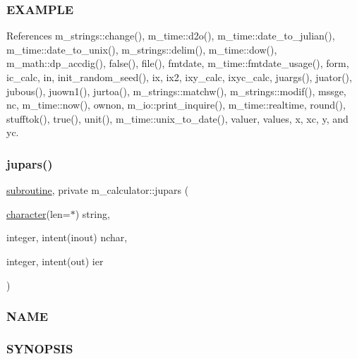 \subsubsection*{E\+X\+A\+M\+P\+LE}

References m\+\_\+strings\+::change(), m\+\_\+time\+::d2o(), m\+\_\+time\+::date\+\_\+to\+\_\+julian(), m\+\_\+time\+::date\+\_\+to\+\_\+unix(), m\+\_\+strings\+::delim(), m\+\_\+time\+::dow(), m\+\_\+math\+::dp\+\_\+accdig(), false(), file(), fmtdate, m\+\_\+time\+::fmtdate\+\_\+usage(), form, ic\+\_\+calc, in, init\+\_\+random\+\_\+seed(), ix, ix2, ixy\+\_\+calc, ixyc\+\_\+calc, juargs(), juator(), jubous(), juown1(), jurtoa(), m\+\_\+strings\+::matchw(), m\+\_\+strings\+::modif(), mssge, nc, m\+\_\+time\+::now(), ownon, m\+\_\+io\+::print\+\_\+inquire(), m\+\_\+time\+::realtime, round(), stufftok(), true(), unit(), m\+\_\+time\+::unix\+\_\+to\+\_\+date(), valuer, values, x, xc, y, and yc.

\mbox{\label{namespacem__calculator_afabadeb80314b52e904de9865f67ea9d}} 
\subsubsection{\texorpdfstring{jupars()}{jupars()}}
{\footnotesize\ttfamily \hyperlink{M__stopwatch_83_8txt_acfbcff50169d691ff02d4a123ed70482}{subroutine}, private m\+\_\+calculator\+::jupars (\begin{DoxyParamCaption}\item[{\hyperlink{option__stopwatch_83_8txt_abd4b21fbbd175834027b5224bfe97e66}{character}(len=$\ast$)}]{string,  }\item[{integer, intent(inout)}]{nchar,  }\item[{integer, intent(out)}]{ier }\end{DoxyParamCaption})\hspace{0.3cm}{\ttfamily [private]}}



\subsubsection*{N\+A\+ME}

\subsubsection*{S\+Y\+N\+O\+P\+S\+IS}


